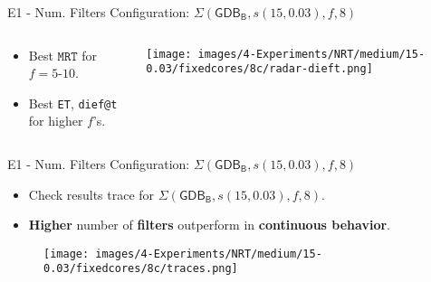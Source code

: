\begin{frame}{E1 - Num. Filters Configuration: \small{$\Sigma(\mathsf{GDB_B}, s(15, 0.03), f, 8)$}}
\begin{columns} %
    \begin{column}{0.45\textwidth}
    \begin{itemize}
        \item Best $\texttt{MRT}$ for $f=5$-$10$.
        \vspace{1em}
        \item Best \texttt{ET}, \texttt{dief@t} for higher $f$'s.
    \end{itemize}
    \end{column}

    \begin{column}{0.7\textwidth}
        \centering
    \texttt{[image: images/4-Experiments/NRT/medium/15-0.03/fixedcores/8c/radar-dieft.png]}
    \end{column}
\end{columns}

\end{frame}


\begin{frame}{E1 - Num. Filters Configuration: \small{$\Sigma(\mathsf{GDB_B}, s(15, 0.03), f, 8)$}}
\begin{itemize}
    \item Check results trace for $\Sigma(\mathsf{GDB_B}, s(15, 0.03), f, 8)$.
    \item \textbf{Higher} number of \textbf{filters} outperform in \textbf{continuous behavior}.
\end{itemize}
\vspace{-1cm}
\begin{figure}
    \hspace{-0.70cm}
    \centering
    \texttt{[image: images/4-Experiments/NRT/medium/15-0.03/fixedcores/8c/traces.png]}
    \label{img:exps-medium-15D-8c-trace}
\end{figure}
\end{frame}


